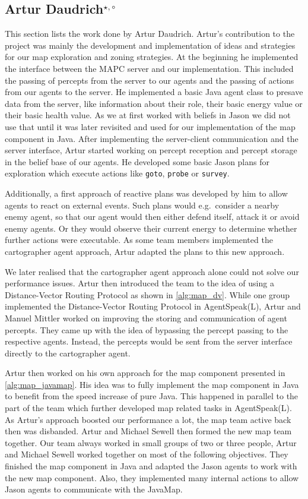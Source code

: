 \subsection[Artur Daudrich]{Artur Daudrich$^{\star,\circ}$}\label{org:artur}
This section lists the work done by Artur Daudrich.
Artur's contribution to the project was mainly the development and implementation of ideas and strategies for our map exploration and zoning strategies.
At the beginning he implemented the interface between the MAPC server and our implementation.
This included the passing of percepts from the server to our agents and the passing of actions from our agents to the server.
He implemented a basic Java agent class to presave data from the server, like information about their role, their basic energy value or their basic health value.
As we at first worked with beliefs in Jason we did not use that until it was later revisited and used for our implementation of the map component in Java.
After implementing the server-client communication and the server interface, Artur started working on percept reception and percept storage in the belief base of our agents.
He developed some basic Jason plans for exploration which execute actions like \texttt{goto}, \texttt{probe} or \texttt{survey}.

Additionally, a first approach of reactive plans was developed by him to allow agents to react on external events.
Such plans would e.g.\ consider a nearby enemy agent, so that our agent would then either defend itself, attack it or avoid enemy agents.
Or they would observe their current energy to determine whether further actions were executable.
As some team members implemented the cartographer agent approach, Artur adapted the plans to this new approach.

We later realised that the cartographer agent approach alone could not solve our performance issues.
Artur then introduced the team to the idea of using a Distance-Vector Routing Protocol as shown in \autoref{alg:map_dv}.
While one group implemented the Distance-Vector Routing Protocol in AgentSpeak(L), Artur and Manuel Mittler worked on improving the storing and communication of agent percepts.
They came up with the idea of bypassing the percept passing to the respective agents.
Instead, the percepts would be sent from the server interface directly to the cartographer agent.

Artur then worked on his own approach for the map component presented in \autoref{alg:map_javamap}.
His idea was to fully implement the map component in Java to benefit from the speed increase of pure Java.
This happened in parallel to the part of the team which further developed map related tasks in AgentSpeak(L).
As Artur's approach boosted our performance a lot, the map team active back then was disbanded.
Artur and Michael Sewell then formed the new map team together.
Our team always worked in small groups of two or three people, Artur and Michael Sewell worked together on most of the following objectives.
They finished the map component in Java and adapted the Jason agents to work with the new map component.
Also, they implemented many internal actions to allow Jason agents to communicate with the JavaMap.

